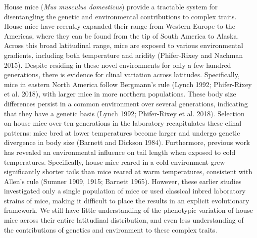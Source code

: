 \documentclass[
]{article}
\begin{document}
House mice (\emph{Mus musculus domesticus}) provide a tractable system
for disentangling the genetic and environmental contributions to complex
traits. House mice have recently expanded their range from Western
Europe to the Americas, where they can be found from the tip of South
America to Alaska. Across this broad latitudinal range, mice are exposed
to various environmental gradients, including both temperature and
aridity (Phifer-Rixey and Nachman 2015). Despite residing in these novel
environments for only a few hundred generations, there is evidence for
clinal variation across latitudes. Specifically, mice in eastern North
America follow Bergmann's rule (Lynch 1992; Phifer-Rixey et al. 2018),
with larger mice in more northern populations. These body size
differences persist in a common environment over several generations,
indicating that they have a genetic basis (Lynch 1992; Phifer-Rixey et
al. 2018). Selection on house mice over ten generations in the
laboratory recapitulates these clinal patterns: mice bred at lower
temperatures become larger and undergo genetic divergence in body size
(Barnett and Dickson 1984). Furthermore, previous work has revealed an
environmental influence on tail length when exposed to cold
temperatures. Specifically, house mice reared in a cold environment grew
significantly shorter tails than mice reared at warm temperatures,
consistent with Allen's rule (Sumner 1909, 1915; Barnett 1965). However,
these earlier studies investigated only a single population of mice or
used classical inbred laboratory strains of mice, making it difficult to
place the results in an explicit evolutionary framework. We still have
little understanding of the phenotypic variation of house mice across
their entire latitudinal distribution, and even less understanding of
the contributions of genetics and environment to these complex traits.
\end{document}

